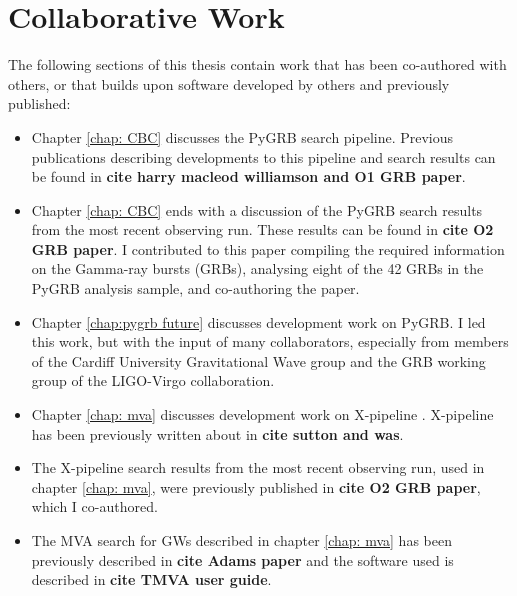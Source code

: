 \documentclass[11pt]{cuthesis}
\newcommand{\xp}{X-pipeline }
\begin{document}
\chapter*{Collaborative Work}
The following sections of this thesis contain work that has been co-authored with others, or that builds upon software developed by others and previously published:
\begin{itemize}
\item Chapter \ref{chap: CBC} discusses the PyGRB search pipeline. Previous publications describing developments to this pipeline and search results can be found in \textbf{cite harry macleod williamson and O1 GRB paper}. 
\item Chapter \ref{chap: CBC} ends with a discussion of the PyGRB search results from the most recent observing run. These results can be found in \textbf{cite O2 GRB paper}. I contributed to this paper compiling the required information on the Gamma-ray bursts (GRBs), analysing eight of the 42 GRBs in the PyGRB analysis sample, and co-authoring the paper.
\item Chapter \ref{chap:pygrb future} discusses development work on PyGRB. I led this work, but with the input of many collaborators, especially from members of the Cardiff University Gravitational Wave group and the GRB working group of the LIGO-Virgo collaboration.
\item Chapter \ref{chap: mva} discusses development work on {\xp}. \xp has been previously written about in \textbf{cite sutton and was}. 
\item The \xp search results from the most recent observing run, used in chapter \ref{chap: mva}, were previously published in \textbf{cite O2 GRB paper}, which I co-authored. 
\item The MVA search for GWs described in chapter \ref{chap: mva} has been previously described in \textbf{cite Adams paper} and the software used is described in \textbf{cite TMVA user guide}.  
\end{itemize}

\mainmatter
\end{document}
